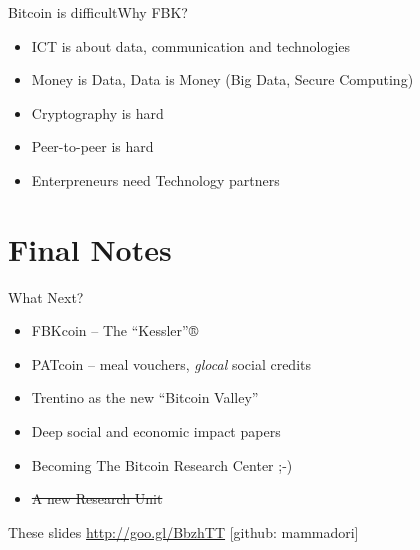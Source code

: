 \documentclass[english,compress]{beamer}
\begin{document}
\begin{frame}{Bitcoin is difficult}{Why FBK?}
\begin{itemize}
  \item ICT is about data, communication and technologies
  \item Money is Data, Data is Money (Big Data, Secure Computing)
  \item Cryptography is hard
  \item Peer-to-peer is hard
  \item Enterpreneurs need Technology partners
 \end{itemize}
\end{frame}


\section{Final Notes}

\begin{frame}{What Next?}
 \begin{itemize}
  \item FBKcoin -- The ``Kessler''®
  \item PATcoin -- meal vouchers, \emph{glocal} social credits
  \item Trentino as the new ``Bitcoin Valley''
  \item Deep social and economic impact papers
  \item Becoming The Bitcoin Research Center ;-)
  \item \st{A new Research Unit}
 \end{itemize}
 
  \begin{block}{These slides}
  \url{http://goo.gl/BbzhTT} [github: mammadori]
  \end{block}

\end{frame}
\end{document}
